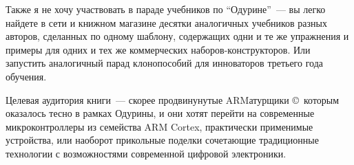\clearpage
Также я не хочу участвовать в параде учебников по ``Одурине''\ --- вы легко
найдете в сети и книжном магазине десятки аналогичных учебников разных авторов,
сделанных по одному шаблону, содержащих одни и те же упражнения и примеры для
одних и тех же коммерческих наборов-конструкторов. Или запустить аналогичный парад
клонопособий для инноваторов третьего года обучения.

Целевая аудитория книги\ --- скорее продвинунутые ARMатурщики \copyright\
которым оказалось тесно в рамках Одурины, и они хотят перейти на современные
микроконтроллеры из семейства ARM Cortex, практически применимые устройства, или
наоборот прикольные поделки сочетающие традиционные технологии с возможностями
современной цифровой электроники.
